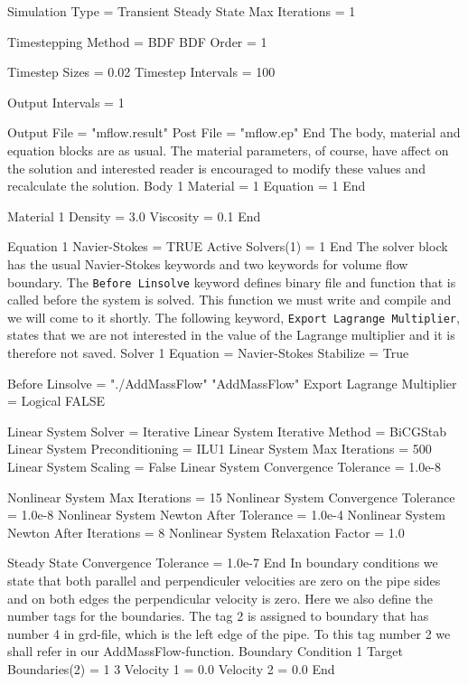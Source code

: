   Simulation Type = Transient
  Steady State Max Iterations = 1

  Timestepping Method = BDF
  BDF Order = 1

  Timestep Sizes = 0.02
  Timestep Intervals = 100

  Output Intervals = 1

  Output File = "mflow.result"
  Post File = "mflow.ep"
End
\ttend
The body, material and equation blocks are as usual. The material parameters,
of course, have affect on the solution and interested reader is encouraged to
modify these values and recalculate the solution.
\ttbegin
Body 1
  Material = 1
  Equation = 1
End

Material 1
  Density = 3.0
  Viscosity = 0.1
End

Equation 1
  Navier-Stokes = TRUE
  Active Solvers(1) = 1
End
\ttend
The solver block has the usual Navier-Stokes keywords and two keywords
for volume flow boundary. 
The {\tt Before Linsolve} keyword defines binary file and function that is
called before the system is solved. This function we must write and
compile and we will come to it shortly. The following keyword,
{\tt Export Lagrange Multiplier}, states that we are not interested in 
the value of the Lagrange multiplier and it is therefore not saved.
\ttbegin
Solver 1
  Equation = Navier-Stokes
  Stabilize = True

  Before Linsolve = "./AddMassFlow" "AddMassFlow"
  Export Lagrange Multiplier = Logical FALSE

  Linear System Solver = Iterative
  Linear System Iterative Method = BiCGStab
  Linear System Preconditioning = ILU1
  Linear System Max Iterations = 500
  Linear System Scaling = False
  Linear System Convergence Tolerance = 1.0e-8

  Nonlinear System Max Iterations = 15
  Nonlinear System Convergence Tolerance = 1.0e-8
  Nonlinear System Newton After Tolerance = 1.0e-4
  Nonlinear System Newton After Iterations = 8
  Nonlinear System Relaxation Factor = 1.0

  Steady State Convergence Tolerance = 1.0e-7
End
\ttend
In boundary conditions we state that both parallel and perpendiculer velocities
are zero on the pipe sides and on both edges the perpendicular velocity is zero.
Here we also define the number tags for the boundaries. The tag 2 is assigned to
boundary that has number 4 in grd-file, which is the left edge of the pipe.
To this tag number 2 we shall refer in our AddMassFlow-function.
\ttbegin
Boundary Condition 1
  Target Boundaries(2) = 1 3
  Velocity 1 = 0.0
  Velocity 2 = 0.0
End

